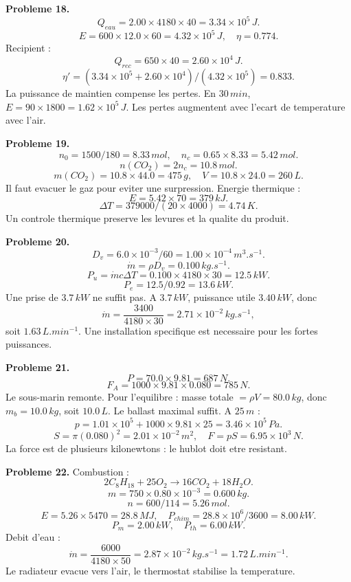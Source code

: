 \documentclass[11pt,a4paper]{article}
\begin{document}
\begin{corrige}
\textbf{Probleme 18.}
\[
Q_{eau}=2.00\times4180\times40=3.34\times10^5\,J.
\]
\[
E=600\times12.0\times60=4.32\times10^5\,J,
\quad \eta=0.774.
\]
Recipient :
\[
Q_{rec}=650\times40=2.60\times10^4\,J.
\]
\[
\eta'=(3.34\times10^5+2.60\times10^4)/(4.32\times10^5)=0.833.
\]
La puissance de maintien compense les pertes. En \(30\,min\), \(E=90\times1800=1.62\times10^5\,J\). Les pertes augmentent avec l'ecart de temperature avec l'air.
\end{corrige}

\begin{corrige}
\textbf{Probleme 19.}
\[
n_0=1500/180=8.33\,mol,
\quad n_c=0.65\times8.33=5.42\,mol.
\]
\[
n(CO_2)=2n_c=10.8\,mol.
\]
\[
m(CO_2)=10.8\times44.0=475\,g,
\quad V=10.8\times24.0=260\,L.
\]
Il faut evacuer le gaz pour eviter une surpression. Energie thermique :
\[
E=5.42\times70=379\,kJ.
\]
\[
\Delta T=379000/(20\times4000)=4.74\,K.
\]
Un controle thermique preserve les levures et la qualite du produit.
\end{corrige}

\begin{corrige}
\textbf{Probleme 20.}
\[
D_v=6.0\times10^{-3}/60=1.00\times10^{-4}\,m^3.s^{-1}.
\]
\[
\dot m=\rho D_v=0.100\,kg.s^{-1}.
\]
\[
P_u=\dot m c\Delta T=0.100\times4180\times30=12.5\,kW.
\]
\[
P_e=12.5/0.92=13.6\,kW.
\]
Une prise de \(3.7\,kW\) ne suffit pas. A \(3.7\,kW\), puissance utile \(3.40\,kW\), donc
\[
\dot m=\frac{3400}{4180\times30}=2.71\times10^{-2}\,kg.s^{-1},
\]
soit \(1.63\,L.min^{-1}\). Une installation specifique est necessaire pour les fortes puissances.
\end{corrige}

\begin{corrige}
\textbf{Probleme 21.}
\[
P=70.0\times9.81=687\,N.
\]
\[
F_A=1000\times9.81\times0.080=785\,N.
\]
Le sous-marin remonte. Pour l'equilibre : masse totale \(=\rho V=80.0\,kg\), donc \(m_b=10.0\,kg\), soit \(10.0\,L\). Le ballast maximal suffit. A \(25\,m\) :
\[
p=1.01\times10^5+1000\times9.81\times25=3.46\times10^5\,Pa.
\]
\[
S=\pi(0.080)^2=2.01\times10^{-2}\,m^2,
\quad F=pS=6.95\times10^3\,N.
\]
La force est de plusieurs kilonewtons : le hublot doit etre resistant.
\end{corrige}

\begin{corrige}
\textbf{Probleme 22.}
Combustion :
\[
2C_8H_{18}+25O_2\rightarrow16CO_2+18H_2O.
\]
\[
m=750\times0.80\times10^{-3}=0.600\,kg.
\]
\[
n=600/114=5.26\,mol.
\]
\[
E=5.26\times5470=28.8\,MJ,
\quad P_{chim}=28.8\times10^6/3600=8.00\,kW.
\]
\[
P_m=2.00\,kW,
\quad P_{th}=6.00\,kW.
\]
Debit d'eau :
\[
\dot m=\frac{6000}{4180\times50}=2.87\times10^{-2}\,kg.s^{-1}=1.72\,L.min^{-1}.
\]
Le radiateur evacue vers l'air, le thermostat stabilise la temperature.
\end{corrige}
\end{document}
